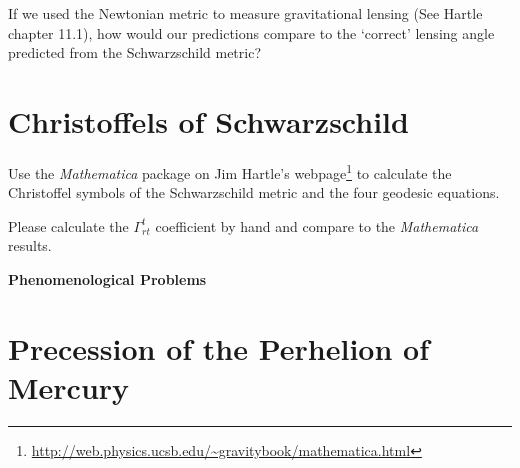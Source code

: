 \documentclass[12pt]{article}
\numberwithin{equation}{section}    %
\begin{document}
If we used the Newtonian metric to measure gravitational lensing (See Hartle chapter 11.1), how would our predictions compare to the `correct' lensing angle predicted from the Schwarzschild metric?

%
%
%


\section{Christoffels of Schwarzschild}

Use the \emph{Mathematica} package on Jim Hartle's webpage\footnote{\url{http://web.physics.ucsb.edu/~gravitybook/mathematica.html}} to calculate the Christoffel symbols of the Schwarzschild metric and the four geodesic equations. 

Please calculate the $\Gamma^t_{rt}$ coefficient by hand and compare to the \emph{Mathematica} results.

\vspace{2em}
{\Large\textbf{\textsf{Phenomenological Problems}}}

\section{Precession of the Perhelion of Mercury}
\end{document}
